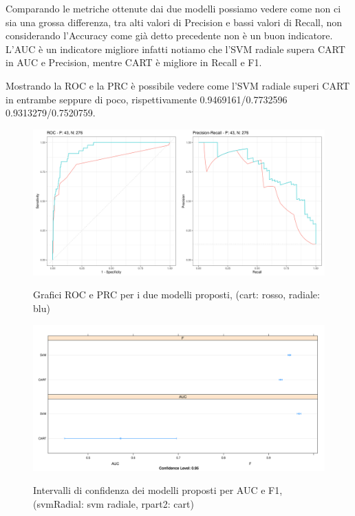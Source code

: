 \noindent
Comparando le metriche ottenute dai due modelli possiamo vedere come non ci sia una grossa differenza, tra alti valori di Precision e bassi valori di Recall, non considerando l'Accuracy come già detto precedente non è un buon indicatore. L'AUC è un indicatore migliore infatti notiamo che l'SVM radiale supera CART in AUC e Precision, mentre CART è migliore in Recall e F1.

\newpage

\noindent
Mostrando la ROC e la PRC è possibile vedere come l'SVM radiale superi CART in entrambe seppure di poco, rispettivamente 0.9469161/0.7732596 0.9313279/0.7520759.
\begin{figure}[H]
    \centering
    \includegraphics[width=\linewidth]{images/comparison/best/best_roc.png}
     \label{fig:roc_prc_modelli_proposti}
    \caption{Grafici ROC e PRC per i due modelli proposti, (cart: rosso, radiale: blu)}
\end{figure}

\begin{figure}[H]
    \centering
    \includegraphics[width=\linewidth]{images/comparison/best/best_dotplot_af.png}
     \label{fig:ci1_modelli_proposti}
    \caption{Intervalli di confidenza dei modelli proposti per AUC e F1, (svmRadial: svm radiale, rpart2: cart)}
\end{figure}

